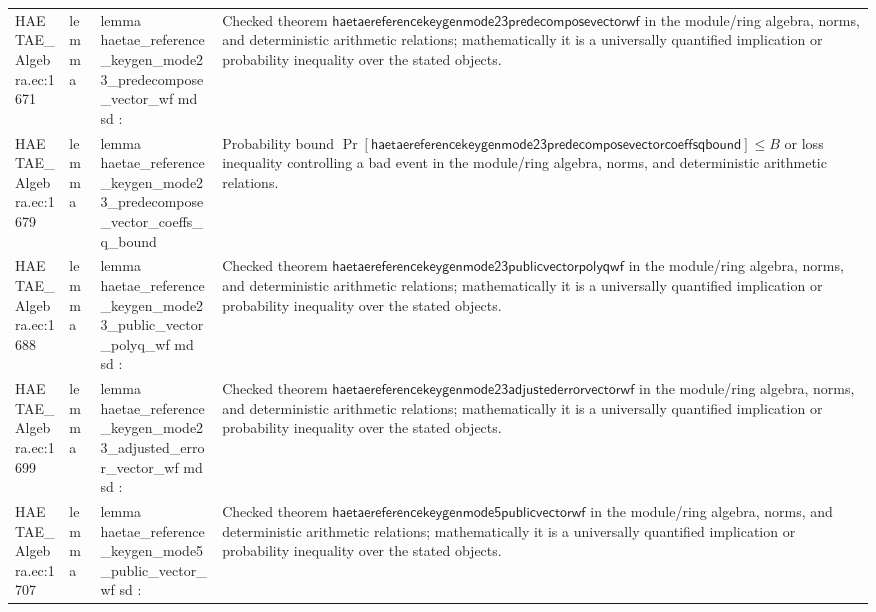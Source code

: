 \documentclass[10pt]{article}
\begin{document}
\begin{longtable}{L{0.11\textwidth}L{0.055\textwidth}L{0.385\textwidth}L{0.41\textwidth}}
HAETAE\_\allowbreak{}Algebra.\allowbreak{}ec:\allowbreak{}1671 & lemma & {\ttfamily\scriptsize lemma haetae\_\allowbreak{}reference\_\allowbreak{}keygen\_\allowbreak{}mode23\_\allowbreak{}predecompose\_\allowbreak{}vector\_\allowbreak{}wf md sd :} & Checked theorem $\mathsf{haetaereferencekeygenmode23predecomposevectorwf}$ in the module/ring algebra, norms, and deterministic arithmetic relations; mathematically it is a universally quantified implication or probability inequality over the stated objects. \\
HAETAE\_\allowbreak{}Algebra.\allowbreak{}ec:\allowbreak{}1679 & lemma & {\ttfamily\scriptsize lemma haetae\_\allowbreak{}reference\_\allowbreak{}keygen\_\allowbreak{}mode23\_\allowbreak{}predecompose\_\allowbreak{}vector\_\allowbreak{}coeffs\_\allowbreak{}q\_\allowbreak{}bound} & Probability bound $\Pr[\mathsf{haetaereferencekeygenmode23predecomposevectorcoeffsqbound}]\le B$ or loss inequality controlling a bad event in the module/ring algebra, norms, and deterministic arithmetic relations. \\
HAETAE\_\allowbreak{}Algebra.\allowbreak{}ec:\allowbreak{}1688 & lemma & {\ttfamily\scriptsize lemma haetae\_\allowbreak{}reference\_\allowbreak{}keygen\_\allowbreak{}mode23\_\allowbreak{}public\_\allowbreak{}vector\_\allowbreak{}polyq\_\allowbreak{}wf md sd :} & Checked theorem $\mathsf{haetaereferencekeygenmode23publicvectorpolyqwf}$ in the module/ring algebra, norms, and deterministic arithmetic relations; mathematically it is a universally quantified implication or probability inequality over the stated objects. \\
HAETAE\_\allowbreak{}Algebra.\allowbreak{}ec:\allowbreak{}1699 & lemma & {\ttfamily\scriptsize lemma haetae\_\allowbreak{}reference\_\allowbreak{}keygen\_\allowbreak{}mode23\_\allowbreak{}adjusted\_\allowbreak{}error\_\allowbreak{}vector\_\allowbreak{}wf md sd :} & Checked theorem $\mathsf{haetaereferencekeygenmode23adjustederrorvectorwf}$ in the module/ring algebra, norms, and deterministic arithmetic relations; mathematically it is a universally quantified implication or probability inequality over the stated objects. \\
HAETAE\_\allowbreak{}Algebra.\allowbreak{}ec:\allowbreak{}1707 & lemma & {\ttfamily\scriptsize lemma haetae\_\allowbreak{}reference\_\allowbreak{}keygen\_\allowbreak{}mode5\_\allowbreak{}public\_\allowbreak{}vector\_\allowbreak{}wf sd :} & Checked theorem $\mathsf{haetaereferencekeygenmode5publicvectorwf}$ in the module/ring algebra, norms, and deterministic arithmetic relations; mathematically it is a universally quantified implication or probability inequality over the stated objects. \\

\end{longtable}
\end{document}
